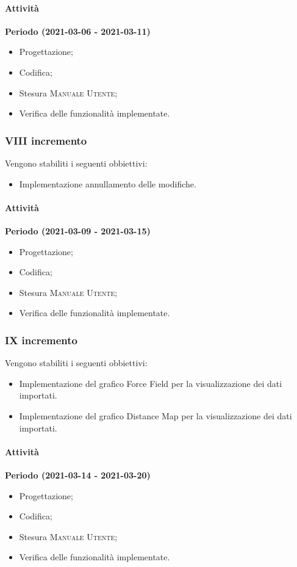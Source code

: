 \documentclass[../piano_di_progetto.tex]{subfiles}
\begin{document}
\paragraph{Attività}
\noindent\textbf{Periodo (2021-03-06 - 2021-03-11)}
\begin{itemize}
    \item Progettazione;
    \item Codifica;
    \item Stesura \textsc{Manuale Utente};
    \item Verifica delle funzionalità implementate.
\end{itemize}


\subsubsection{VIII incremento}
Vengono stabiliti i seguenti obbiettivi:
\begin{itemize}
    \item Implementazione annullamento delle modifiche.
\end{itemize}
\paragraph{Attività}
\noindent\textbf{Periodo (2021-03-09 - 2021-03-15)}
\begin{itemize}
    \item Progettazione;
    \item Codifica;
    \item Stesura \textsc{Manuale Utente};
    \item Verifica delle funzionalità implementate.
\end{itemize}


\subsubsection{IX incremento}
Vengono stabiliti i seguenti obbiettivi:
\begin{itemize}
    \item Implementazione del grafico Force Field per la visualizzazione dei dati importati.
    \item Implementazione del grafico Distance Map per la visualizzazione dei dati importati.
\end{itemize}
\paragraph{Attività}
\noindent\textbf{Periodo (2021-03-14 - 2021-03-20)}
\begin{itemize}
    \item Progettazione;
    \item Codifica;
    \item Stesura \textsc{Manuale Utente};
    \item Verifica delle funzionalità implementate.
\end{itemize}
\end{document}

